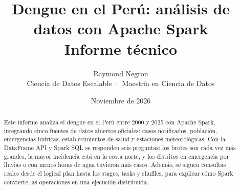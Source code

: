 \documentclass[11pt,a4paper]{article}
\title{Dengue en el Perú: análisis de datos con Apache Spark\\[4pt]\large Informe técnico}
\author{Raymond Negron\\[2pt]\small Ciencia de Datos Escalable · Maestría en Ciencia de Datos}
\date{Noviembre de 2026}
\begin{document}
\maketitle

\begin{abstract}
Este informe analiza el dengue en el Perú entre 2000 y 2025 con Apache Spark, integrando cinco fuentes de datos
abiertos oficiales: casos notificados, población, emergencias hídricas, establecimientos de salud y estaciones
meteorológicas. Con la DataFrame API y Spark SQL se responden seis preguntas: los brotes son cada vez más grandes,
la mayor incidencia está en la costa norte, y los distritos en emergencia por lluvias o con menos horas de agua
tuvieron más casos. Además, se siguen consultas reales desde el logical plan hasta los stages, tasks y shuffles,
para explicar cómo Spark convierte las operaciones en una ejecución distribuida.
\end{abstract}










\printbibliography[heading=bibnumbered,title={Referencias}]
\end{document}
